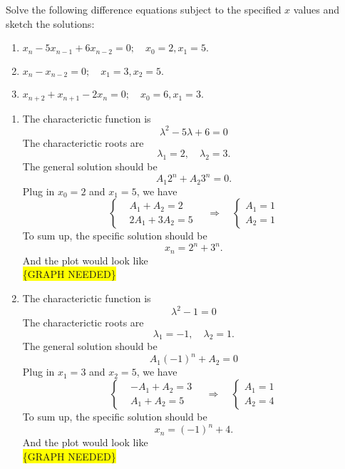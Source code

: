 \documentclass[
    classnum=MATH564,
    classname=MATHEMATICAL\ MODELING,
    due=January\ 28\,\ 2020,
    author=Gabrielle\ Streeter\qquad Hannah\ Wu\qquad\ Minghang\ Li,
    authorshort=Streeter\ \&\ Wu\ \&\ Li,
    teacher= Zachary\ M.\ Boyd,
    hw=1
]{hw-template}
\newcommand{\requiregraph}{\colorbox{yellow}{\{GRAPH NEEDED\}}}
\begin{document}
\begin{homeworkProblem}
Solve the following difference equations subject to the specified $x$ values and
sketch the solutions:
\begin{enumerate}
    \item $x_n - 5x_{n-1} + 6x_{n-2} = 0;\quad x_0 = 2, x_1 = 5.$
    \addtocounter{enumi}{1}
    \item $x_n - x_{n-2} = 0;\quad x_1 = 3, x_2 = 5.$
    \addtocounter{enumi}{1}
    \item $x_{n+2} + x_{n+1} - 2x_n = 0; \quad x_0 = 6, x_1 = 3.$
\end{enumerate}

\segline

\solution

\begin{enumerate}
    \item The characterictic function is \[
        \lambda^2 - 5\lambda + 6 = 0
    \]
    The characterictic roots are \[
        \lambda_1 = 2, \quad \lambda_2 = 3.
    \]
    The general solution should be \[
        A_1 2^n + A_2 3^n  = 0.
    \]
    Plug in $x_0 = 2$ and $x_1 = 5$, we have \[
        \left\{
        \begin{aligned}
            &A_1 + A_2  = 2\\
            &2A_1  + 3A_2 = 5
        \end{aligned}
        \right.
        \quad
        \Rightarrow
        \quad
        \left\{
        \begin{aligned}
            A_1 = 1\\
            A_2 = 1
        \end{aligned}
        \right.
    \]
    To sum up, the specific solution should be $$
        x_n = 2^n + 3^n.
    $$
    And the plot would look like\\
    \requiregraph
    \addtocounter{enumi}{1}

    \item The characterictic function is \[
        \lambda^2 - 1 = 0
    \]
    The characterictic roots are \[
        \lambda_1 = -1, \quad \lambda_2 = 1.
    \]
    The general solution should be \[
        A_1 (-1)^n + A_2  = 0
    \]
    Plug in $x_1 = 3$ and $x_2 = 5$, we have \[
        \left\{
        \begin{aligned}
            &-A_1 + A_2  = 3\\
            &A_1  + A_2 = 5
        \end{aligned}
        \right.
        \quad
        \Rightarrow
        \quad
        \left\{
        \begin{aligned}
            A_1 = 1\\
            A_2 = 4
        \end{aligned}
        \right.
    \]
    To sum up, the specific solution should be $$
        x_n = (-1)^n + 4.
    $$
    And the plot would look like\\
    \requiregraph
    \addtocounter{enumi}{1}


\end{enumerate}
\end{homeworkProblem}
\end{document}
